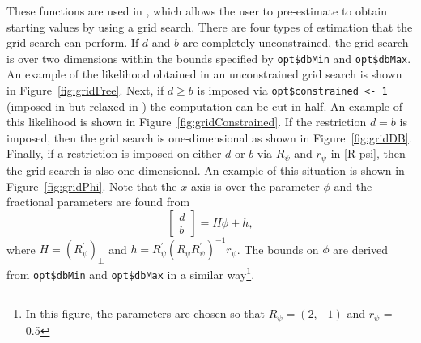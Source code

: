 \documentclass[article]{jss}
\newcommand{\fct}[1]{\code{#1()}}
\begin{document}
These functions are used in \fct{LikeGridSearch}, which allows the user to pre-estimate to obtain starting values by using a grid search. There are four types of estimation that the grid search can perform. If $d$ and $b$ are completely unconstrained, the grid search is over two dimensions within the bounds specified by \verb|opt$dbMin| and \verb|opt$dbMax|. An example of the likelihood obtained in an unconstrained grid search is shown in Figure~\ref{fig:gridFree}. Next, if $d\ge b$ is imposed via \verb|opt$constrained <- 1| (imposed in \cite{johansen2012likelihood} but relaxed in \cite{JN2018}) the computation can be cut in half. An example of this likelihood is shown in Figure~\ref{fig:gridConstrained}. If the restriction $d=b$ is imposed, then the grid search is one-dimensional as shown in Figure~\ref{fig:gridDB}. Finally, if a restriction is imposed on either $d$ or $b$ via $R_\psi$ and $r_\psi$ in \eqref{R psi}, then the grid search is also one-dimensional. An example of this situation is shown in Figure~\ref{fig:gridPhi}. Note that the $x$-axis is over the parameter $\phi$ and the fractional parameters are found from
\begin{equation}
  \begin{bmatrix}
    d \\ b
  \end{bmatrix}
  = H\phi + h,
\end{equation}
where $H = (R_{\psi}^{\prime})_\perp$ and $h = R_{\psi}^{\prime} (R_\psi R_{\psi}^{\prime})^{-1} r_\psi$. The bounds on $\phi$ are derived from \verb|opt$dbMin| and \verb|opt$dbMax| in a similar way\footnote{In this figure, the parameters are chosen so that $R_{\psi} = (2, -1)$ and $r_\psi$ = 0.5}.
\end{document}
